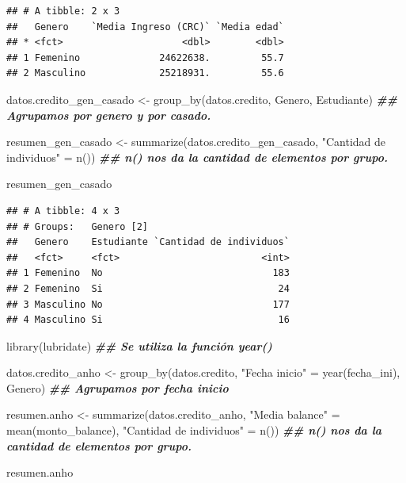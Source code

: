 \documentclass[
  12pt,
]{book}
\newenvironment{Shaded}{\begin{snugshade}}{\end{snugshade}}
\newcommand{\DocumentationTok}[1]{\textcolor[rgb]{0.56,0.35,0.01}{\textbf{\textit{#1}}}}
\newcommand{\FunctionTok}[1]{\textcolor[rgb]{0.00,0.00,0.00}{#1}}
\newcommand{\NormalTok}[1]{#1}
\newcommand{\OtherTok}[1]{\textcolor[rgb]{0.56,0.35,0.01}{#1}}
\newcommand{\StringTok}[1]{\textcolor[rgb]{0.31,0.60,0.02}{#1}}
\begin{document}
\begin{verbatim}
## # A tibble: 2 x 3
##   Genero    `Media Ingreso (CRC)` `Media edad`
## * <fct>                     <dbl>        <dbl>
## 1 Femenino              24622638.         55.7
## 2 Masculino             25218931.         55.6
\end{verbatim}

\begin{Shaded}
\begin{Highlighting}[]
\NormalTok{datos.credito\_gen\_casado }\OtherTok{\textless{}{-}} \FunctionTok{group\_by}\NormalTok{(datos.credito, Genero, Estudiante) }\DocumentationTok{\#\# Agrupamos por genero y por casado.}

\NormalTok{resumen\_gen\_casado }\OtherTok{\textless{}{-}} \FunctionTok{summarize}\NormalTok{(datos.credito\_gen\_casado, }\StringTok{"Cantidad de individuos"} \OtherTok{=} \FunctionTok{n}\NormalTok{()) }\DocumentationTok{\#\# n() nos da la cantidad de elementos por grupo.}

\NormalTok{resumen\_gen\_casado}
\end{Highlighting}
\end{Shaded}

\begin{verbatim}
## # A tibble: 4 x 3
## # Groups:   Genero [2]
##   Genero    Estudiante `Cantidad de individuos`
##   <fct>     <fct>                         <int>
## 1 Femenino  No                              183
## 2 Femenino  Si                               24
## 3 Masculino No                              177
## 4 Masculino Si                               16
\end{verbatim}

\begin{Shaded}
\begin{Highlighting}[]
\FunctionTok{library}\NormalTok{(lubridate) }\DocumentationTok{\#\# Se utiliza la función year()}

\NormalTok{datos.credito\_anho }\OtherTok{\textless{}{-}} \FunctionTok{group\_by}\NormalTok{(datos.credito, }\StringTok{"Fecha inicio"} \OtherTok{=} \FunctionTok{year}\NormalTok{(fecha\_ini), Genero) }\DocumentationTok{\#\# Agrupamos por fecha inicio}

\NormalTok{resumen.anho }\OtherTok{\textless{}{-}} \FunctionTok{summarize}\NormalTok{(datos.credito\_anho, }\StringTok{"Media balance"} \OtherTok{=} \FunctionTok{mean}\NormalTok{(monto\_balance), }\StringTok{"Cantidad de individuos"} \OtherTok{=} \FunctionTok{n}\NormalTok{()) }\DocumentationTok{\#\# n() nos da la cantidad de elementos por grupo.}

\NormalTok{resumen.anho}
\end{Highlighting}
\end{Shaded}
\end{document}
